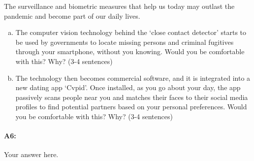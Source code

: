 The surveillance and biometric measures that help us today may outlast the pandemic and become part of our daily lives.
\begin{enumerate}[(c)]
    \item
          The computer vision technology behind the `close contact detector' starts to be used by governments to locate missing persons and criminal fugitives through your smartphone, without you knowing. Would you be comfortable with this? Why? (3-4 sentences)

    \item
          The technology then becomes commercial software, and it is integrated into a new dating app `Cvpid'. Once installed, as you go about your day, the app passively scans people near you and matches their faces to their social media profiles to find potential partners based on your personal preferences. Would you be comfortable with this? Why? (3-4 sentences)

\end{enumerate}

\paragraph{A6:} Your answer here.

